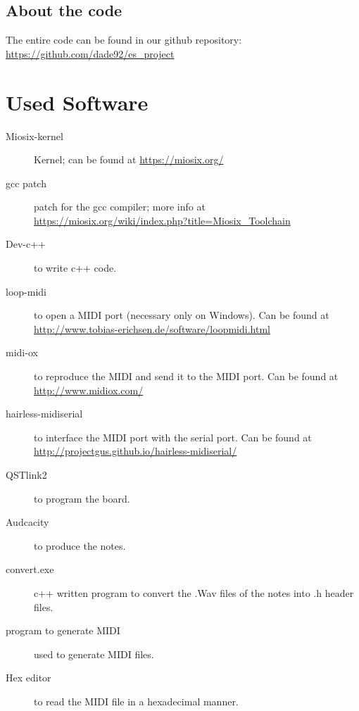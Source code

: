\documentclass[12pt]{article}
\begin{document}
\subsection{About the code}

The entire code can be found in our github repository: \url{https://github.com/dade92/es_project}

\section{Used Software} \label{sec:used}
\begin{description} 
	\item[Miosix-kernel] Kernel; can be found at \url{https://miosix.org/}
	\item[gcc patch] patch for the gcc compiler; more info at \url{https://miosix.org/wiki/index.php?title=Miosix_Toolchain}
	\item[Dev-c++] to write c++  code.
	\item[loop-midi] to open a MIDI port (necessary only on Windows). Can be found at \url{http://www.tobias-erichsen.de/software/loopmidi.html}
	\item[midi-ox] to reproduce the MIDI and send it to the MIDI port. Can be found at \url{http://www.midiox.com/}
	\item[hairless-midiserial] to interface the MIDI port with the serial port. Can be found at \url{http://projectgus.github.io/hairless-midiserial/}
	\item[QSTlink2] to program the board.
	\item[Audcacity] to produce the notes.
	\item[convert.exe] c++ written program to convert the .Wav files  of the notes into .h header files.
	\item[program to generate MIDI] used to generate MIDI files.
	\item[Hex editor] to read the MIDI file in a hexadecimal manner.
\end{description}
\end{document}
